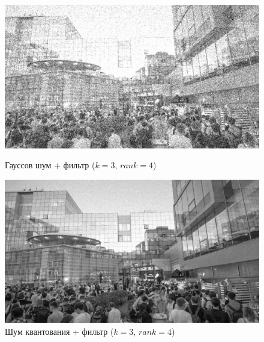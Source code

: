 \documentclass[a4paper]{article}
\begin{document}
\begin{figure}[H]
    \begin{minipage}{0.49\textwidth}
        \centering \includegraphics[width=\textwidth]{images/3_nonlinear_filters/gaussian - rang (k=3, rank=4).jpg}
        \caption{Гауссов шум + фильтр ($k = 3$, $rank = 4$)}
    \end{minipage}\hfill
    \begin{minipage}{0.49\textwidth}
        \centering \includegraphics[width=\textwidth]{images/3_nonlinear_filters/poisson - rang (k=3, rank=4).jpg}
        \caption{Шум квантования + фильтр ($k = 3$, $rank = 4$)}
    \end{minipage}
\end{figure}
\end{document}
